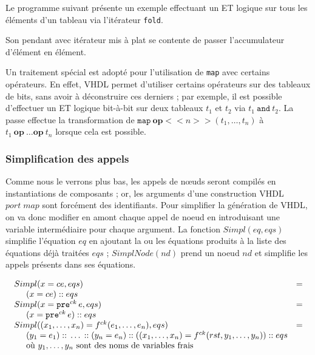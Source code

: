\documentclass[a4paper]{article}
\newcommand{\mybox}[1]{\mbox{\tt{#1}}}
\newcommand{\ind}[0]{\hspace{0.5cm}}
\newcommand{\Cons}[0]{\; \mathbf{::} \;}
\newcommand{\Pre}[1]{\mybox{pre}^{ck} \, #1}
\newcommand{\App}[2]{#1^{ck}(#2)}
\begin{document}
Le programme suivant pr\'esente un exemple effectuant un ET logique sur tous les
\'el\'ements d'un tableau via l'it\'erateur \texttt{fold}.



Son pendant avec it\'erateur mis \`a plat se contente de passer l'accumulateur
d'\'el\'ement en \'el\'ement.



Un traitement sp\'ecial est adopt\'e pour l'utilisation de \texttt{map} avec
certains op\'erateurs. En effet, VHDL permet d'utiliser certains op\'erateurs sur
des tableaux de bits, sans avoir \`a d\'econstruire ces derniers ; par exemple, il
est possible d'effectuer un ET logique bit-\`a-bit sur deux tableaux $t_1$ et
$t_2$ via $t_1 \ \texttt{and} \ t_2$. La passe effectue la transformation de
$\texttt{map}\ \textbf{op}<<n>>(t_1,\dots,t_n)$ \`a $t_1\ \textbf{op}\ \dots
\textbf{op}\ t_n$ lorsque cela est possible.

\subsubsection{Simplification des appels}

\newcommand{\simpl}[2]{Simpl(#1,#2)}
\newcommand{\simplnd}[1]{SimplNode(#1)}

Comme nous le verrons plus bas, les appels de nœuds seront compil\'es en
instantiations de composants ; or, les arguments d'une construction VHDL $port
\; map$ sont forc\'ement des identifiants. Pour simplifier la g\'en\'eration de
VHDL, on va donc modifier en amont chaque appel de noeud en introduisant une
variable interm\'ediaire pour chaque argument. La fonction $\simpl{eq}{eqs}$
simplifie l'\'equation $eq$ en ajoutant la ou les \'equations produits \`a la liste
des \'equations d\'ej\`a trait\'ees $eqs$ ; $\simplnd{nd}$ prend un noeud $nd$ et
simplifie les appels pr\'esents dans ses \'equations.

\[
\begin{array}{ll}
  \simpl{x = ce}{eqs} & = \\
  \ind (x = ce) \Cons eqs \\
  \simpl{x = \Pre{e}}{eqs} & = \\
  \ind (x = \Pre{e}) \Cons eqs \\

  \simpl{(x_1,\dots,x_n) = \App{f}{e_1,\dots,e_n}}{eqs} & = \\
  \ind (y_1 = e_1) \Cons \dots \Cons (y_n = e_n)
  \Cons ((x_1,\dots,x_n) = \App{f}{rst,y_1,\dots,y_n}) \Cons eqs \\
  \ind \mbox{o\`u } y_1,\dots,y_n \mbox{ sont des noms de variables frais}
\end{array}
\]
\end{document}
